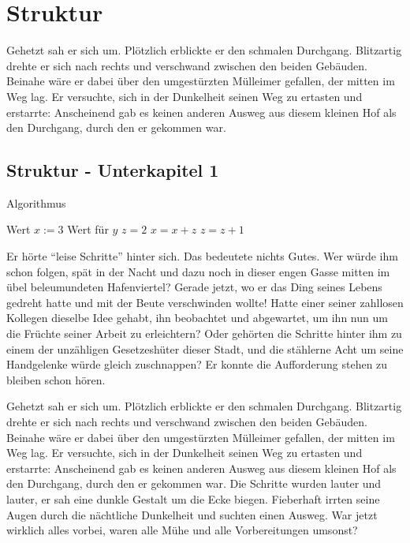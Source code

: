 
\chapter{Struktur}
\label{Struktur}
%
Gehetzt sah er sich um. Plötzlich erblickte er den schmalen
Durchgang. Blitzartig drehte er sich nach rechts und verschwand
zwischen den beiden Gebäuden. Beinahe wäre er dabei über den
umgestürzten Mülleimer gefallen, der mitten im Weg lag. Er
versuchte, sich in der Dunkelheit seinen Weg zu ertasten und
erstarrte: Anscheinend gab es keinen anderen Ausweg aus diesem
kleinen Hof als den Durchgang, durch den er gekommen war.

\section{Struktur - Unterkapitel 1}
\label{Struktur_-_Unterkapitel_1}
%
    \begin{algorithm}[t]
    \centering
    \caption[Ein Algorithmus]{Algorithmus} \label{algo_1}
    \begin{algorithmic}
    \REQUIRE Wert $x :=3$
    \ENSURE Wert für $y$
    \STATE $z = 2$
    \STATE $x = x + z$
    \STATE $z = z + 1$
    \ENDFOR
    \ENDWHILE
    \end{algorithmic}
    \end{algorithm}


Er hörte \enquote{leise Schritte} hinter sich. Das bedeutete
nichts Gutes. Wer würde ihm schon folgen, spät in der Nacht und
dazu noch in dieser engen Gasse mitten im übel beleumundeten
Hafenviertel? Gerade jetzt, wo er das Ding seines Lebens gedreht
hatte und mit der Beute verschwinden wollte! Hatte einer seiner
zahllosen Kollegen dieselbe Idee gehabt, ihn beobachtet und
abgewartet, um ihn nun um die Früchte seiner Arbeit zu
erleichtern? Oder gehörten die Schritte hinter ihm zu einem der
unzähligen Gesetzeshüter dieser Stadt, und die stählerne Acht um
seine Handgelenke würde gleich zuschnappen? Er konnte die
Aufforderung stehen zu bleiben
schon hören.

Gehetzt sah er sich um. Plötzlich erblickte er den schmalen
Durchgang. Blitzartig drehte er sich nach rechts und verschwand
zwischen den beiden Gebäuden. Beinahe wäre er dabei über den
umgestürzten Mülleimer gefallen, der mitten im Weg lag. Er
versuchte, sich in der Dunkelheit seinen Weg zu ertasten und
erstarrte: Anscheinend gab es keinen anderen Ausweg aus diesem
kleinen Hof als den Durchgang, durch den er gekommen war. Die
Schritte wurden lauter und lauter, er sah eine dunkle Gestalt um
die Ecke biegen. Fieberhaft irrten seine Augen durch die
nächtliche Dunkelheit und suchten einen Ausweg. War jetzt wirklich
alles vorbei, waren alle Mühe und alle Vorbereitungen umsonst?

